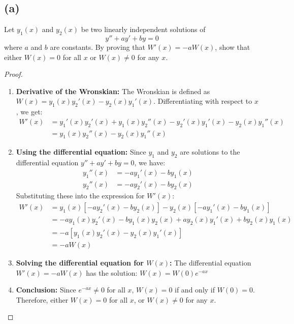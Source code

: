 \documentclass{article}
\begin{document}
\subsection*{(a)}
Let $y_1(x)$ and $y_2(x)$ be two linearly independent solutions of 
\[y'' + ay' + by = 0\]
where $a$ and $b$ are constants. By proving that $W'(x) = -aW(x)$, show that either $W(x) = 0$ for all $x$ or $W(x) \neq 0$ for any $x$.
\begin{proof}
~\begin{enumerate}
\item \textbf{Derivative of the Wronskian:}
The Wronskian is defined as $W(x) = y_1(x)y_2'(x) - y_2(x)y_1'(x)$.  Differentiating with respect to $x$, we get:
\begin{align*}
W'(x) &= y_1'(x)y_2'(x) + y_1(x)y_2''(x) - y_2'(x)y_1'(x) - y_2(x)y_1''(x) \\
&= y_1(x)y_2''(x) - y_2(x)y_1''(x)
\end{align*}
\item \textbf{Using the differential equation:}
Since $y_1$ and $y_2$ are solutions to the differential equation $y'' + ay' + by = 0$, we have:
\begin{align*}
y_1''(x) &= -ay_1'(x) - by_1(x) \\
y_2''(x) &= -ay_2'(x) - by_2(x)
\end{align*}
Substituting these into the expression for $W'(x)$:
\begin{align*}
W'(x) &= y_1(x)[-ay_2'(x) - by_2(x)] - y_2(x)[-ay_1'(x) - by_1(x)] \\
&= -ay_1(x)y_2'(x) - by_1(x)y_2(x) + ay_2(x)y_1'(x) + by_2(x)y_1(x) \\
&= -a[y_1(x)y_2'(x) - y_2(x)y_1'(x)] \\
&= -aW(x)
\end{align*}
\item \textbf{Solving the differential equation for $W(x)$:}
The differential equation $W'(x) = -aW(x)$ has the solution:
$W(x) = W(0)e^{-ax}$
\item \textbf{Conclusion:}
Since $e^{-ax} \neq 0$ for all $x$, $W(x) = 0$ if and only if $W(0) = 0$. Therefore, either $W(x) = 0$ for all $x$, or $W(x) \neq 0$ for any $x$.
\end{enumerate}
\end{proof}
\end{document}
